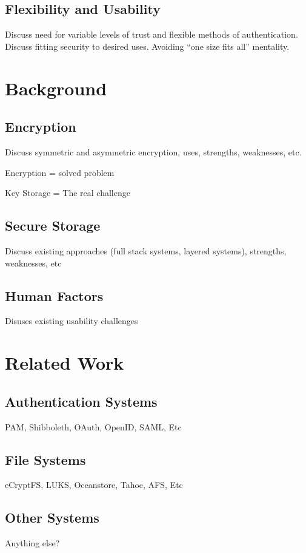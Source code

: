 \subsection{Flexibility and Usability}

Discuss need for variable levels of trust and flexible methods of
authentication. Discuss fitting security to desired uses. Avoiding
``one size fits all'' mentality.

\section{Background}

\subsection{Encryption}

Discuss symmetric and asymmetric encryption, uses, strengths,
weaknesses, etc.

Encryption = solved problem

Key Storage = The real challenge

\subsection{Secure Storage}

Discuss existing approaches (full stack systems, layered systems),
strengths, weaknesses, etc

\subsection{Human Factors}

Disuses existing usability challenges

\section{Related Work}

\subsection{Authentication Systems}

PAM, Shibboleth, OAuth, OpenID, SAML, Etc

\subsection{File Systems}

eCryptFS, LUKS, Oceanstore, Tahoe, AFS, Etc

\subsection{Other Systems}

Anything else?
